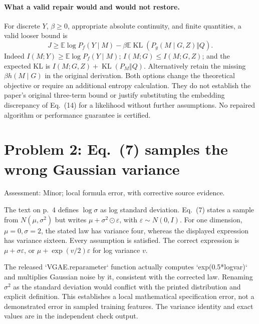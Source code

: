 \documentclass[10pt]{article}
\begin{document}
\paragraph*{What a valid repair would and would not restore.}\mbox{}\par
For discrete \(Y\), \(\beta\ge0\), appropriate absolute continuity, and finite quantities, a valid looser bound is \[J\ge
\mathbb E\log P_f(Y\mid M)
-\beta\mathbb E\operatorname{KL}(P_g(M\mid G,Z)\Vert Q).\] Indeed \(I(M;Y)\ge\mathbb E\log P_f(Y\mid M)\); \(I(M;G)\le I(M;G,Z)\); and the expected KL is \(I(M;G,Z)+\operatorname{KL}(P_M\Vert Q)\). Alternatively retain the missing \(\beta h(M\mid G)\) in the original derivation. Both options change the theoretical objective or require an additional entropy calculation. They do not establish the paper’s original three-term bound or justify substituting the embedding discrepancy of Eq. (14) for a likelihood without further assumptions. No repaired algorithm or performance guarantee is certified.\par
\section*{Problem 2: Eq. (7) samples the wrong Gaussian variance}
Assessment: Minor; local formula error, with corrective source evidence.\par
The text on p. 4 defines \(\log\sigma\) as log standard deviation. Eq. (7) states a sample from \(N(\mu,\sigma^2)\) but writes \(\mu+\sigma^2\odot\varepsilon\), with \(\varepsilon\sim N(0,I)\). For one dimension, \(\mu=0,\sigma=2\), the stated law has variance four, whereas the displayed expression has variance sixteen. Every assumption is satisfied. The correct expression is \(\mu+\sigma\varepsilon\), or \(\mu+\exp(v/2)\varepsilon\) for log variance \(v\).\par
The released `VGAE.reparameter` function actually computes `exp(0.5*logvar)` and multiplies Gaussian noise by it, consistent with the corrected law. Renaming \(\sigma^2\) as the standard deviation would conflict with the printed distribution and explicit definition. This establishes a local mathematical specification error, not a demonstrated error in sampled training features. The variance identity and exact values are in the independent check output.\par
\end{document}
